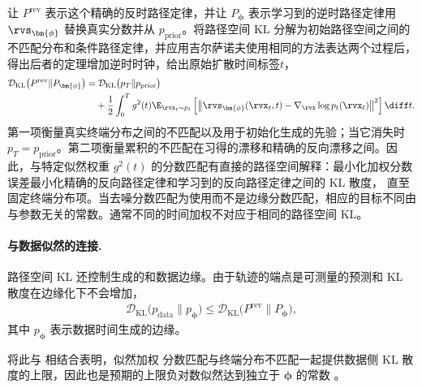 让 $P^{\mathrm{rev}}$ 表示这个精确的反时路径定律，并让
$P_{\bm{\phi}}$ 表示学习到的逆时路径定律用 $\rvs_{\bm{\phi}}$ 替换真实分数并从
$p_{\mathrm{prior}}$。将路径空间 KL 分解为初始路径空间之间的不匹配分布和条件路径定律，并应用吉尔萨诺夫使用相同的方法表达两个过程后，得出后者的定理增加逆时时钟，给出原始扩散时间标签$t$，
\begin{align}\label{eq:girsanov-KL}
\begin{aligned}
\mathcal{D}_{\mathrm{KL}}
\bigl(P^{\mathrm{rev}}\|P_{\bm{\phi}}\bigr)
=
&\;
\mathcal{D}_{\mathrm{KL}}
\bigl(p_T\|p_{\mathrm{prior}}\bigr)
\\
&+
\frac{1}{2}
\int_0^T
g^2(t)
\E_{\rvx_t\sim p_t}
\left[
\left\|
\rvs_{\bm{\phi}}(\rvx_t,t)
-
\nabla_{\rvx}\log p_t(\rvx_t)
\right\|^2
\right]
\diff t .
\end{aligned}
\end{align}
第一项衡量真实终端分布之间的不匹配以及用于初始化生成的先验；当它消失时
$p_T=p_{\mathrm{prior}}$。第二项衡量累积的不匹配在习得的漂移和精确的反向漂移之间。因此，与特定似然权重 $g^2(t)$ 的分数匹配有直接的路径空间解释：最小化加权分数误差最小化精确的反向路径定律和学习到的反向路径定律之间的 KL 散度，
直至固定终端分布项。当去噪分数匹配为使用而不是边缘分数匹配，相应的目标不同由与参数无关的常数。通常不同的时间加权不对应于相同的路径空间 KL。

\paragraph{与数据似然的连接.}
路径空间 KL 还控制生成的和数据边缘。由于轨迹的端点是可测量的预测和 KL 散度在边缘化下不会增加，
\begin{align}\label{eq:girsanov-likelihood}
\mathcal{D}_{\mathrm{KL}}
\bigl(p_{\mathrm{data}}\|p_{\bm{\phi}}\bigr)
\leq
\mathcal{D}_{\mathrm{KL}}
\bigl(P^{\mathrm{rev}}\|P_{\bm{\phi}}\bigr),
\end{align}
其中 $p_{\bm{\phi}}$ 表示数据时间生成的边缘。

将此与  相结合表明，似然加权
分数匹配与终端分布不匹配一起提供数据侧 KL 散度的上限，因此也是预期的上限负对数似然达到独立于 $\bm{\phi}$ 的常数
\citep{song2021maximum}。
